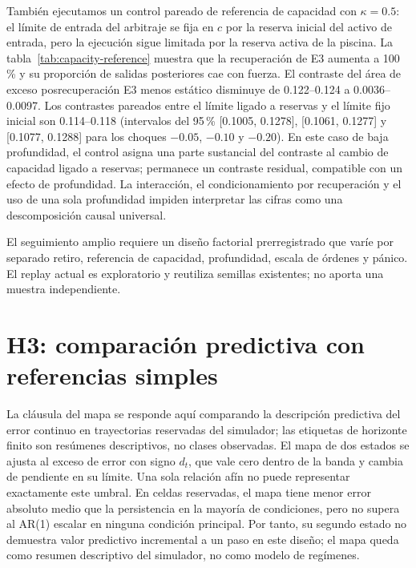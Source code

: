 También ejecutamos un control pareado de referencia de capacidad con $\kappa=0.5$: el límite de entrada del arbitraje se fija en $c$ por la reserva inicial del activo de entrada, pero la ejecución sigue limitada por la reserva activa de la piscina. La tabla~\ref{tab:capacity-reference} muestra que la recuperación de E3 aumenta a 100\,\% y su proporción de salidas posteriores cae con fuerza. El contraste del área de exceso posrecuperación E3 menos estático disminuye de 0.122--0.124 a 0.0036--0.0097. Los contrastes pareados entre el límite ligado a reservas y el límite fijo inicial son 0.114--0.118 (intervalos del 95\,\% [0.1005, 0.1278], [0.1061, 0.1277] y [0.1077, 0.1288] para los choques $-0.05$, $-0.10$ y $-0.20$). En este caso de baja profundidad, el control asigna una parte sustancial del contraste al cambio de capacidad ligado a reservas; permanece un contraste residual, compatible con un efecto de profundidad. La interacción, el condicionamiento por recuperación y el uso de una sola profundidad impiden interpretar las cifras como una descomposición causal universal.



El seguimiento amplio requiere un diseño factorial prerregistrado que varíe por separado retiro, referencia de capacidad, profundidad, escala de órdenes y pánico. El replay actual es exploratorio y reutiliza semillas existentes; no aporta una muestra independiente.

\section{H3: comparación predictiva con referencias simples}
\label{sec:res-h3}

La cláusula del mapa se responde aquí comparando la descripción predictiva del error continuo en trayectorias reservadas del simulador; las etiquetas de horizonte finito son resúmenes descriptivos, no clases observadas. El mapa de dos estados se ajusta al exceso de error con signo $d_t$, que vale cero dentro de la banda y cambia de pendiente en su límite. Una sola relación afín no puede representar exactamente este umbral. En celdas reservadas, el mapa tiene menor error absoluto medio que la persistencia en la mayoría de condiciones, pero no supera al AR(1) escalar en ninguna condición principal. Por tanto, su segundo estado no demuestra valor predictivo incremental a un paso en este diseño; el mapa queda como resumen descriptivo del simulador, no como modelo de regímenes.

